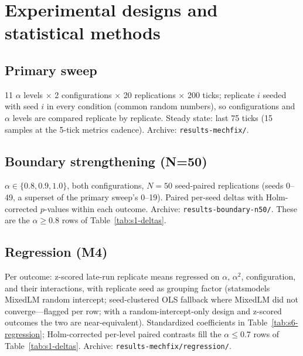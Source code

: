 \documentclass[11pt]{article}
\begin{document}
\section{Experimental designs and statistical methods}\label{si:design}

\subsection{Primary sweep}
11 $\alpha$ levels $\times$ 2 configurations $\times$ 20 replications
$\times$ 200 ticks; replicate $i$ seeded with seed $i$ in every condition
(common random numbers), so configurations and $\alpha$ levels are
compared replicate by replicate. Steady state: last 75 ticks (15 samples
at the 5-tick metrics cadence). Archive: \texttt{results-mechfix/}.

\subsection{Boundary strengthening (N=50)}
$\alpha \in \{0.8, 0.9, 1.0\}$, both configurations, $N = 50$ seed-paired
replications (seeds 0--49, a superset of the primary sweep's 0--19).
Paired per-seed deltas with Holm-corrected $p$-values within each
outcome. Archive: \texttt{results-boundary-n50/}. These are the
$\alpha \geq 0.8$ rows of Table~\ref{tab:s1-deltas}.

\subsection{Regression (M4)}
Per outcome: z-scored late-run replicate means regressed on $\alpha$,
$\alpha^2$, configuration, and their interactions, with replicate seed as
grouping factor (statsmodels MixedLM random intercept; seed-clustered OLS
fallback where MixedLM did not converge---flagged per row; with a
random-intercept-only design and z-scored outcomes the two are
near-equivalent). Standardized coefficients in
Table~\ref{tab:s6-regression}; Holm-corrected per-level paired contrasts
fill the $\alpha \leq 0.7$ rows of Table~\ref{tab:s1-deltas}. Archive:
\texttt{results-mechfix/regression/}.
\end{document}
